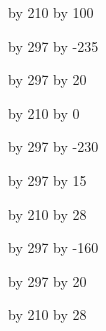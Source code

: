 

\setlength{\textwidth}{14cm}
\setlength{\oddsidemargin}{1cm}

%

\pagestyle{empty}


\newcount \Z
{}


\newlength{\numhpclogox}
\setlength{\numhpclogox}{\paperwidth} %
\divide\numhpclogox by 210
\multiply\numhpclogox by 100

\newlength{\numhpclogoy}
\setlength{\numhpclogoy}{\paperheight} %
\divide \numhpclogoy by 297
\multiply \numhpclogoy by -235

\newlength{\numhpclogoheight}
\setlength{\numhpclogoheight}{\paperheight} %
\divide\numhpclogoheight by 297
\multiply\numhpclogoheight by 20

\newlength{\kitlogox}
\setlength{\kitlogox}{\paperwidth} %
\divide\kitlogox by 210
\multiply\kitlogox by 0

\newlength{\kitlogoy}
\setlength{\kitlogoy}{\paperheight} %
\divide \kitlogoy by 297
\multiply \kitlogoy by -230

\newlength{\kitlogoheight}
\setlength{\kitlogoheight}{\paperheight} %
\divide\kitlogoheight by 297
\multiply\kitlogoheight by 15


\newlength{\emcllogox}
\setlength{\emcllogox}{\paperwidth} %
\divide\emcllogox by 210
\multiply\emcllogox by 28

\newlength{\emcllogoy}
\setlength{\emcllogoy}{\paperheight} %
\divide \emcllogoy by 297
\multiply \emcllogoy by -160

\newlength{\emcllogoheight}
\setlength{\emcllogoheight}{\paperheight} %
\divide\emcllogoheight by 297
\multiply\emcllogoheight by 20

\newlength{\hiflowlogox}
\setlength{\hiflowlogox}{\paperwidth} %
\divide\hiflowlogox by 210
\multiply\hiflowlogox by 28

